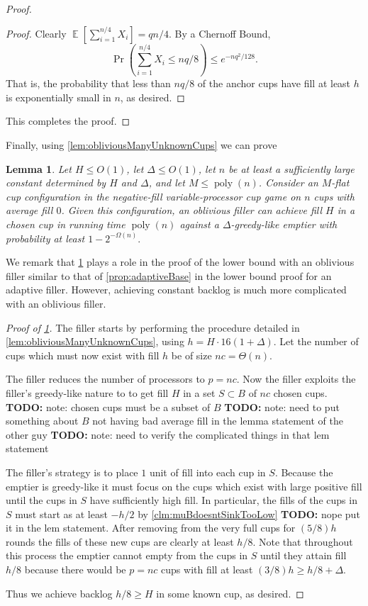 \documentclass[twocolumn]{article}[10pt]
\newcommand{\todo}[1]{{\color{red}\textbf{TODO:} #1}}
\DeclareMathOperator{\E}{\mathbb{E}}
\DeclareMathOperator{\poly}{\text{poly}}
\newtheorem{lemma}{Lemma}
\begin{document}
\begin{proof}
\begin{proof}
  Clearly $\E\left[\sum_{i=1}^{n/4} X_i\right] = qn/4.$
  By a Chernoff Bound,
  $$\Pr\left(\sum_{i=1}^{n/4} X_i\le nq/8\right) \le e^{-nq^2/128}.$$ That is, the
  probability that less than $nq/8$ of the anchor cups have fill at least $h$ is
  exponentially small in $n$, as desired.

\end{proof}

This completes the proof.
  
\end{proof}

Finally, using \cref{lem:obliviousManyUnknownCups} we can prove 
\begin{lemma}
  \label{lem:obliviousBase}
  Let $H \le O(1)$, let $\Delta \le O(1)$, let $n$ be at
  least a sufficiently large constant determined by $H$ and $\Delta$, and let $M \le \poly(n)$. 
  Consider an $M$-flat cup configuration in the negative-fill variable-processor cup
  game on $n$ cups with average fill $0$.
  Given this configuration, an oblivious filler can achieve fill $H$
  in a chosen cup in running time $\poly(n)$ against a
  $\Delta$-greedy-like emptier with probability at least $1-2^{-\Omega(n)}.$
\end{lemma}
We remark that \cref{lem:obliviousBase} plays a role in the
proof of the lower bound with an oblivious filler similar to
that of \cref{prop:adaptiveBase} in the lower bound proof for an adaptive
filler. However, achieving constant backlog is much more
complicated with an oblivious filler. 
\begin{proof}[Proof of \cref{lem:obliviousBase}]
  The filler starts by performing the procedure detailed in
  \ref{lem:obliviousManyUnknownCups}, using $h = H\cdot 16(1+\Delta)$. 
  Let the number of cups which must now exist with
  fill $h$ be of size $nc = \Theta(n)$.

  The filler reduces the number of processors to $p=nc$. 
  Now the filler exploits the filler's greedy-like nature to
  to get fill $H$ in a set $S\subset B$ of $nc$ chosen cups.
  \todo{note: chosen cups must be a subset of $B$}
  \todo{note: need to put something about $B$ not having bad
  average fill in the lemma statement of the other guy}
  \todo{note: need to verify the complicated things in that lem
  statement}

  The filler's strategy is to place $1$ unit of fill into each
  cup in $S$. Because the emptier is greedy-like it
  must focus on the cups which exist with large
  positive fill until the cups in $S$ have sufficiently high fill.
  In particular, the fills of the cups in $S$ must start as at
least $-h/2$ by \cref{clm:muBdoesntSinkTooLow} \todo{nope put it in the
lem statement}. After removing
  from the very full cups for $(5/8)h$ rounds the
  fills of these new cups are clearly at least $h/8$. Note that
  throughout this process the emptier cannot empty from the
  cups in $S$ until they attain fill $h/8$ because there would be
  $p=nc$ cups with fill at least $(3/8)h \ge h/8 + \Delta$.

  Thus we achieve backlog $h/8 \ge H$ in some known cup, as desired.

\end{proof}
\end{document}
